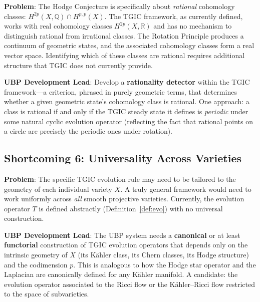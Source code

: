 \documentclass[11pt,a4paper]{article}
\theoremstyle{definition}
\theoremstyle{plain}
\newcommand{\QQ}{\mathbb{Q}}
\newcommand{\RR}{\mathbb{R}}
\begin{document}
\begin{tcolorbox}[colback=red!5, colframe=red!40!black, title={\textbf{Shortcoming 5: No Rationality Filter}}]
\textbf{Problem}: The Hodge Conjecture is specifically about \emph{rational} cohomology classes: $H^{2p}(X, \QQ) \cap H^{p,p}(X)$. The TGIC framework, as currently defined, works with real cohomology classes $H^{2p}(X, \RR)$ and has no mechanism to distinguish rational from irrational classes. The Rotation Principle produces a continuum of geometric states, and the associated cohomology classes form a real vector space. Identifying which of these classes are rational requires additional structure that TGIC does not currently provide.

\medskip
\textbf{UBP Development Lead}: Develop a \textbf{rationality detector} within the TGIC framework---a criterion, phrased in purely geometric terms, that determines whether a given geometric state's cohomology class is rational. One approach: a class is rational if and only if the TGIC steady state it defines is \emph{periodic} under some natural cyclic evolution operator (reflecting the fact that rational points on a circle are precisely the periodic ones under rotation).
\end{tcolorbox}

\subsection{Shortcoming 6: Universality Across Varieties}\label{sec:sc6}

\begin{tcolorbox}[colback=red!5, colframe=red!40!black, title={\textbf{Shortcoming 6: Variety-Dependent Evolution}}]
\textbf{Problem}: The specific TGIC evolution rule may need to be tailored to the geometry of each individual variety $X$. A truly general framework would need to work uniformly across \emph{all} smooth projective varieties. Currently, the evolution operator $T$ is defined abstractly (Definition~\ref{def:evo}) with no universal construction.

\medskip
\textbf{UBP Development Lead}: The UBP system needs a \textbf{canonical} or at least \textbf{functorial} construction of TGIC evolution operators that depends only on the intrinsic geometry of $X$ (its K\"ahler class, its Chern classes, its Hodge structure) and the codimension $p$. This is analogous to how the Hodge star operator and the Laplacian are canonically defined for any K\"ahler manifold. A candidate: the evolution operator associated to the Ricci flow or the K\"ahler--Ricci flow restricted to the space of subvarieties.
\end{tcolorbox}
\end{document}

